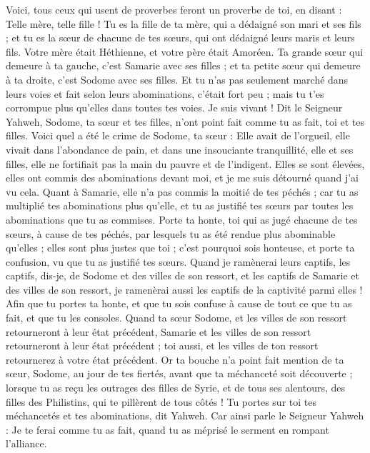 \begin{multicols}{2}
Voici, tous ceux qui usent de proverbes feront un proverbe de toi, en disant : Telle mère, telle fille !
Tu es la fille de ta mère, qui a dédaigné son mari et ses fils ; et tu es la sœur de chacune de tes sœurs, qui ont dédaigné leurs maris et leurs fils. Votre mère était Héthienne, et votre père était Amoréen.
Ta grande sœur qui demeure à ta gauche, c'est Samarie avec ses filles ; et ta petite sœur qui demeure à ta droite, c'est Sodome avec ses filles.
Et tu n'as pas seulement marché dans leurs voies et fait selon leurs abominations, c'était fort peu ; mais tu t'es corrompue plus qu'elles dans toutes tes voies.
Je suis vivant ! Dit le Seigneur Yahweh, Sodome, ta sœur et tes filles, n'ont point fait comme tu as fait, toi et tes filles.
Voici quel a été le crime de Sodome, ta sœur : Elle avait de l'orgueil, elle vivait dans l'abondance de pain, et dans une insouciante tranquillité, elle et ses filles, elle ne fortifiait pas la main du pauvre et de l'indigent.
Elles se sont élevées, elles ont commis des abominations devant moi, et je me suis détourné quand j'ai vu cela.
Quant à Samarie, elle n'a pas commis la moitié de tes péchés ; car tu as multiplié tes abominations plus qu'elle, et tu as justifié tes sœurs par toutes les abominations que tu as commises.
Porte ta honte, toi qui as jugé chacune de tes sœurs, à cause de tes péchés, par lesquels tu as été rendue plus abominable qu'elles ; elles sont plus justes que toi ; c'est pourquoi sois honteuse, et porte ta confusion, vu que tu as justifié tes sœurs.
Quand je ramènerai leurs captifs, les captifs, dis-je, de Sodome et des villes de son ressort, et les captifs de Samarie et des villes de son ressort, je ramenèrai aussi les captifs de la captivité parmi elles !
Afin que tu portes ta honte, et que tu sois confuse à cause de tout ce que tu as fait, et que tu les consoles.
Quand ta sœur Sodome, et les villes de son ressort retourneront à leur état précédent, Samarie et les villes de son ressort retourneront à leur état précédent ; toi aussi, et les villes de ton ressort retournerez à votre état précédent.
Or ta bouche n'a point fait mention de ta sœur, Sodome, au jour de tes fiertés,
avant que ta méchanceté soit découverte ; lorsque tu as reçu les outrages des filles de Syrie, et de tous ses alentours, des filles des Philistins, qui te pillèrent de tous côtés !
Tu portes sur toi tes méchancetés et tes abominations, dit Yahweh.
Car ainsi parle le Seigneur Yahweh : Je te ferai comme tu as fait, quand tu as méprisé le serment en rompant l'alliance.

\end{multicols}
